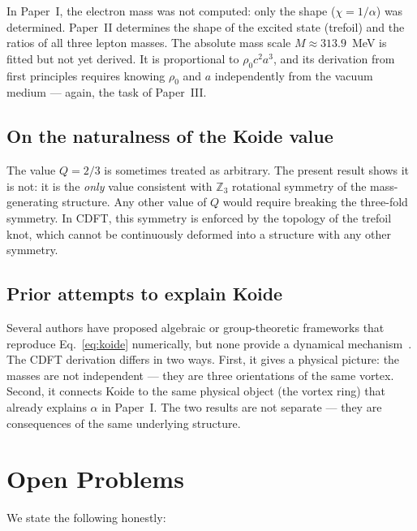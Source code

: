 \documentclass[11pt]{article}
\begin{document}
In Paper~I, the electron mass was not computed: only the shape ($\chi = 1/\alpha$)
was determined.
Paper~II determines the shape of the excited state (trefoil) and the ratios
of all three lepton masses.
The absolute mass scale $M \approx 313.9$~MeV is fitted but not yet derived.
It is proportional to $\rho_0 c^2 a^3$, and its derivation from first principles
requires knowing $\rho_0$ and $a$ independently from the vacuum medium --- again,
the task of Paper~III.

\subsection{On the naturalness of the Koide value}

The value $Q = 2/3$ is sometimes treated as arbitrary.
The present result shows it is not: it is the \emph{only} value consistent with
$\mathbb{Z}_3$ rotational symmetry of the mass-generating structure.
Any other value of $Q$ would require breaking the three-fold symmetry.
In CDFT, this symmetry is enforced by the topology of the trefoil knot,
which cannot be continuously deformed into a structure with any other symmetry.

\subsection{Prior attempts to explain Koide}

Several authors have proposed algebraic or group-theoretic frameworks that
reproduce Eq.~\eqref{eq:koide} numerically, but none provide a dynamical
mechanism~\cite{Brannen2006,Koide2005,Foot1994}.
The CDFT derivation differs in two ways.
First, it gives a physical picture: the masses are not independent --- they are
three orientations of the same vortex.
Second, it connects Koide to the same physical object (the vortex ring) that
already explains $\alpha$ in Paper~I.
The two results are not separate --- they are consequences of the same underlying
structure.


\section{Open Problems}
\label{sec:open}

We state the following honestly:
\end{document}

